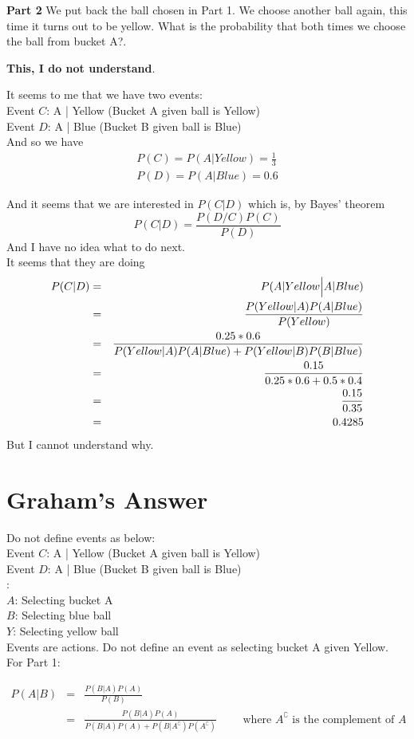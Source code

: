 \documentclass{article}
\newcommand{\beq}{\begin{equation}}
\newcommand{\eeq}{\end{equation}}
\newcommand{\ber}{\begin{eqnarray}}
\newcommand{\eer}{\end{eqnarray}}
\begin{document}
{\textbf{Part 2}} We put back the ball chosen in Part 1. We choose another ball again, this time it turns out to be yellow. What is the probability that both times we choose the ball from bucket A?.

{\textbf{This, I do not understand}}.

It seems to me that we have two events:\\
Event $C$: A | Yellow  (Bucket A given ball is Yellow) \\
Event $D$: A | Blue    (Bucket B given ball is Blue)\\
And so we have\\
\ber
P(C) = P(A|Yellow) = \frac{1}{3} \\
P(D) = P(A|Blue)   = 0.6
\eer

And it seems that we are interested in $P(C|D)$ which is, by Bayes' theorem
\beq
P(C|D) = \frac{P(D/C)P(C)}{P(D)}
\eeq
And I have no idea what to do next.\\

It seems that they are doing 
\ber
P(C|D)&=&P(A|Yellow\Big{|}A|Blue)\\
&=& \frac{P(Yellow|A)P(A|Blue)}{P(Yellow)} \\
&=& \frac{0.25*0.6}{P(Yellow|A)P(A|Blue)+P(Yellow|B)P(B|Blue)} \\
      &=& \frac{0.15}{0.25*0.6+0.5*0.4} \\
      &=& \frac{0.15}{0.35} \\
      &=& 0.4285
\eer
But I cannot understand why.
\section{ Graham's Answer}
Do not define events as below:\\
Event $C$: A | Yellow  (Bucket A given ball is Yellow) \\
Event $D$: A | Blue    (Bucket B given ball is Blue)\\

:\\
$A$: Selecting bucket A \\
$B$: Selecting blue ball \\
$Y$: Selecting yellow ball \\

\noindent Events are actions. Do not define an event as selecting bucket A given Yellow.\\

For Part 1:

\ber
P(A|B) &=& \frac{P(B|A)P(A)}{P(B)} \\
       &=& \frac{P(B|A)P(A)}{P(B|A)P(A) + P(B|A^\complement)P(A^\complement)} \qquad \text{ where  } A^\complement \text{ is the complement of } A
\eer
\end{document}
